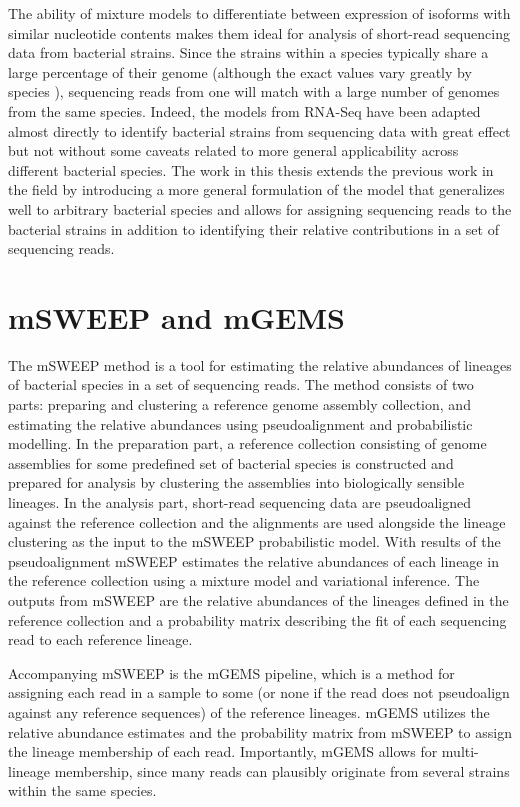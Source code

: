 \documentclass[officiallayout]{tktla}
\begin{document}
The ability of mixture models to differentiate between expression of
isoforms with similar nucleotide contents makes them ideal for
analysis of short-read sequencing data from bacterial strains. Since
the strains within a species typically share a large percentage of
their genome (although the exact values vary greatly by species
\citep{doolittle2006genomics, van2020diversity}), sequencing reads
from one will match with a large number of genomes from the same
species. Indeed, the models from RNA-Seq have been adapted almost
directly to identify bacterial strains from sequencing data
\citep{sankar2016bayesian} with great effect but not without some
caveats related to more general applicability across different
bacterial species. The work in this thesis extends the previous work
in the field \citep{sankar2016bayesian} by introducing a more general
formulation of the model that generalizes well to arbitrary bacterial
species and allows for assigning sequencing reads to the bacterial
strains in addition to identifying their relative contributions in a
set of sequencing reads.

\section{mSWEEP and mGEMS}

The mSWEEP method is a tool for estimating the relative abundances of
lineages of bacterial species in a set of sequencing reads. The method
consists of two parts: preparing and clustering a reference genome
assembly collection, and estimating the relative abundances using
pseudoalignment \citep{bray2016near} and probabilistic modelling. In
the preparation part, a reference collection consisting of genome
assemblies for some predefined set of bacterial species is constructed
and prepared for analysis by clustering the assemblies into
biologically sensible lineages. In the analysis part, short-read
sequencing data are pseudoaligned against the reference collection and
the alignments are used alongside the lineage clustering as the input to
the mSWEEP probabilistic model. With results of the pseudoalignment
mSWEEP estimates the relative abundances of each lineage in the
reference collection using a mixture model and variational
inference. The outputs from mSWEEP are the relative abundances of the
lineages defined in the reference collection and a probability matrix
describing the fit of each sequencing read to each reference lineage.

Accompanying mSWEEP is the mGEMS pipeline, which is a method for
assigning each read in a sample to some (or none if the read does not
pseudoalign against any reference sequences) of the reference
lineages. mGEMS utilizes the relative abundance estimates and the
probability matrix from mSWEEP to assign the lineage membership of
each read. Importantly, mGEMS allows for multi-lineage membership,
since many reads can plausibly originate from several strains within
the same species.
\end{document}
